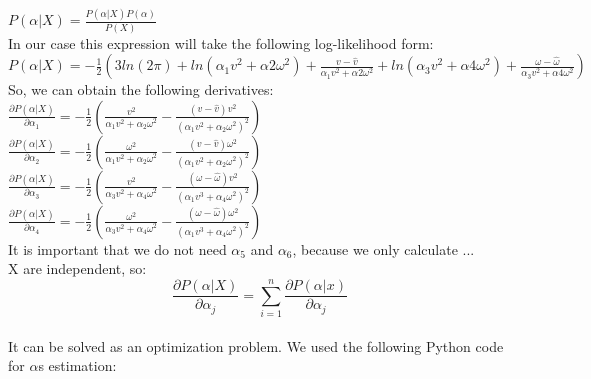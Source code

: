 \documentclass[a4paper, 12pt]{article}
\begin{document}
$P(\alpha|X) = \frac{P(\alpha|X)P(\alpha)}{P(X)}$\\

In our case this expression will take the following log-likelihood form:\\
$P(\alpha|X) = -\frac{1}{2}(3ln(2\pi) + ln(\alpha_1v^2 + \alpha2 \omega^2) + \frac{v - \hat{v}}{\alpha_1v^2 + \alpha2 \omega^2} + ln(\alpha_3v^2 + \alpha4 \omega^2) + \frac{\omega - \hat{\omega}}{\alpha_3v^2 + \alpha4 \omega^2})$\\

So, we can obtain the following derivatives:\\
$\frac{\partial P(\alpha|X)}{\partial \alpha_1} = -\frac{1}{2} (\frac{v^2}{\alpha_1v^2 + \alpha_2 \omega^2} - \frac{(v - \hat{v})v^2}{(\alpha_1v^2 + \alpha_2 \omega^2)^2})$\\
$\frac{\partial P(\alpha|X)}{\partial \alpha_2} = -\frac{1}{2} (\frac{\omega^2}{\alpha_1v^2 + \alpha_2 \omega^2} - \frac{(v - \hat{v})\omega^2}{(\alpha_1v^2 + \alpha_2 \omega^2)^2})$\\
$\frac{\partial P(\alpha|X)}{\partial \alpha_3} = -\frac{1}{2} (\frac{v^2}{\alpha_3v^2 + \alpha_4 \omega^2} - \frac{(\omega - \hat{\omega})v^2}{(\alpha_1v^3 + \alpha_4 \omega^2)^2})$\\
$\frac{\partial P(\alpha|X)}{\partial \alpha_4} = -\frac{1}{2} (\frac{\omega^2}{\alpha_3v^2 + \alpha_4 \omega^2} - \frac{(\omega - \hat{\omega})\omega^2}{(\alpha_1v^3 + \alpha_4 \omega^2)^2})$\\

It is important that we do not need $\alpha_5$ and $\alpha_6$, because we only calculate ...\\

X are independent, so:\\
$$\frac{\partial P(\alpha|X)}{\partial \alpha_j} = \sum_{i=1}^{n}\frac{\partial P(\alpha|x)}{\partial \alpha_j}$$\\
It can be solved as an optimization problem. We used the following Python code for $\alpha$s estimation:\\
\end{document}
